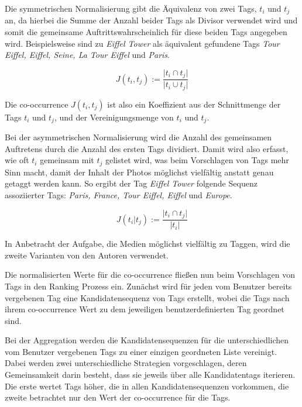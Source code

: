 Die symmetrischen Normalisierung gibt die Äquivalenz von zwei Tags, ${t_i}$ und ${t_j}$ an, da hierbei die Summe der Anzahl beider Tags als Divisor verwendet wird und somit die gemeinsame Auftrittswahrscheinlich für diese beiden Tags angegeben wird. Beispielsweise sind zu \emph{Eiffel Tower} als äquivalent gefundene Tags \emph{Tour Eiffel, Eiffel, Seine, La Tour Eiffel} und \emph{Paris}.
\begin{figure}[hptb]
  \begin{equation}
  \label{symmetricNormalization}
   J(t_i, t_j) := \frac{\vert t_i \cap t_j \vert}{ \vert t_i \cup t_j \vert }
  \end{equation}
\end{figure}

Die co-occurrence $J(t_i, t_j)$ ist also ein Koeffizient aus der Schnittmenge der Tags ${t_i}$ und ${t_j}$, und der Vereinigungsmenge von ${t_i}$ und ${t_j}$.

Bei der asymmetrischen Normalisierung wird die Anzahl des gemeinsamen Auftretens durch die Anzahl des ersten Tags dividiert. Damit wird also erfasst, wie oft ${t_i}$ gemeinsam mit ${t_j}$ gelistet wird, was beim Vorschlagen von Tags mehr Sinn macht, damit der Inhalt der Photos möglichst vielfältig anstatt genau getaggt werden kann. So ergibt der Tag \emph{Eiffel Tower} folgende Sequenz assoziierter Tags: \emph{Paris, France, Tour Eiffel, Eiffel} und \emph{Europe}.
\begin{figure}[hptb]
 \begin{equation}
 \label{asymmetricNormalization}
  J(t_i \vert t_j) := \frac{\vert t_i \cap t_j \vert}{ \vert t_i \vert }
 \end{equation}
\end{figure}

In Anbetracht der Aufgabe, die Medien möglichst vielfältig zu Taggen, wird die zweite Varianten von den Autoren verwendet.


Die normalisierten Werte für die co-occurrence fließen nun beim Vorschlagen von Tags in den Ranking Prozess ein. Zunächst wird für jeden vom Benutzer bereits vergebenen Tag eine Kandidatensequenz von Tags erstellt, wobei die Tags nach ihrem co-occurrence Wert zu dem jeweiligen benutzerdefinierten Tag geordnet sind.

Bei der Aggregation werden die Kandidatensequenzen für die unterschiedlichen vom Benutzer vergebenen Tags zu einer einzigen geordneten Liste vereinigt. Dabei werden zwei unterschiedliche Strategien vorgeschlagen, deren Gemeinsamkeit darin besteht, dass sie jeweils über alle Kandidatentags iterieren. Die erste wertet Tags höher, die in allen Kandidatensequenzen vorkommen, die zweite betrachtet nur den Wert der co-occurrence für die Tags. 

